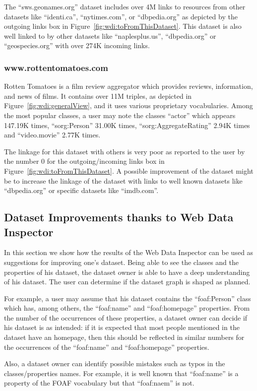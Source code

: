 The ``sws.geonames.org'' dataset includes over 4M links to resources from other datasets like ``identi.ca'', ``nytimes.com'', or ``dbpedia.org'' as depicted by the outgoing links box in Figure~\ref{fig:wdi:toFromThisDataset}. This dataset is also well linked to by other datasets like ``naplesplus.us'', ``dbpedia.org'' or ``geospecies.org'' with over 274K incoming links.

\subsubsection{www.rottentomatoes.com}

Rotten Tomatoes is a film review aggregator which provides reviews, information, and news of films. It contains over 11M triples, as depicted in Figure~\ref{fig:wdi:generalView}, and it uses various proprietary vocabularies. Among the most popular classes, a user may note the classes ``actor'' which appears 147.19K times, ``sorg:Person'' 31.00K times, ``sorg:AggregateRating'' 2.94K times and ``video.movie'' 2.77K times.

The linkage for this dataset with others is very poor as reported to the user by the number 0 for the outgoing/incoming links box in Figure~\ref{fig:wdi:toFromThisDataset}. A possible improvement of the dataset might be to increase the linkage of the dataset with links to well known datasets like ``dbpedia.org'' or specific datasets like ``imdb.com''.

\subsection{Dataset Improvements thanks to Web Data Inspector}

In this section we show how the results of the Web Data Inspector can be used as suggestions for improving one's dataset. Being able to see the classes and the properties of his dataset, the dataset owner is able to have a deep understanding of his dataset. The user can determine if the dataset graph is shaped as planned.

For example, a user may assume that his dataset contains the ``foaf:Person'' class which has, among others, the ``foaf:name'' and ``foaf:homepage'' properties. From the number of the occurrences of these properties, a dataset owner can decide if his dataset is as intended: if it is expected that most people mentioned in the dataset have an homepage, then this should be reflected in similar numbers for the occurrences of the ``foaf:name'' and ``foaf:homepage'' properties.

Also, a dataset owner can identify possible mistakes such as typos in the classes/properties names. For example, it is well known that ``foaf:name'' is a property of the FOAF vocabulary but that ``foaf:naem'' is not.
